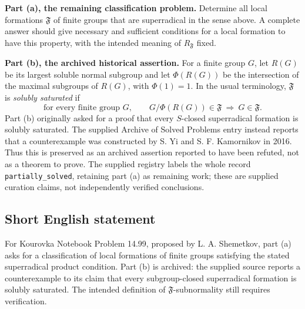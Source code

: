 \documentclass[11pt]{article}
\begin{document}
\textbf{Part (a), the remaining classification problem.} Determine all local formations \(\mathfrak F\) of finite groups that are superradical in the sense above. A complete answer should give necessary and sufficient conditions for a local formation to have this property, with the intended meaning of \(R_{\mathfrak F}\) fixed.

\textbf{Part (b), the archived historical assertion.} For a finite group \(G\), let \(R(G)\) be its largest soluble normal subgroup and let \(\Phi(R(G))\) be the intersection of the maximal subgroups of \(R(G)\), with \(\Phi(1)=1\). In the usual terminology, \(\mathfrak F\) is \emph{solubly saturated} if
\[
\text{for every finite group }G,\qquad
G/\Phi(R(G))\in\mathfrak F\ \Longrightarrow\ G\in\mathfrak F.
\]
Part (b) originally asked for a proof that every \(S\)-closed superradical formation is solubly saturated. The supplied Archive of Solved Problems entry instead reports that a counterexample was constructed by S. Yi and S. F. Kamornikov in 2016. Thus this is preserved as an archived assertion reported to have been refuted, not as a theorem to prove. The supplied registry labels the whole record \texttt{partially\_solved}, retaining part (a) as remaining work; these are supplied curation claims, not independently verified conclusions.
\subsection{Short English statement}
For Kourovka Notebook Problem 14.99, proposed by L. A. Shemetkov, part (a) asks for a classification of local formations of finite groups satisfying the stated superradical product condition. Part (b) is archived: the supplied source reports a counterexample to its claim that every subgroup-closed superradical formation is solubly saturated. The intended definition of \(\mathfrak F\)-subnormality still requires verification.
\end{document}
